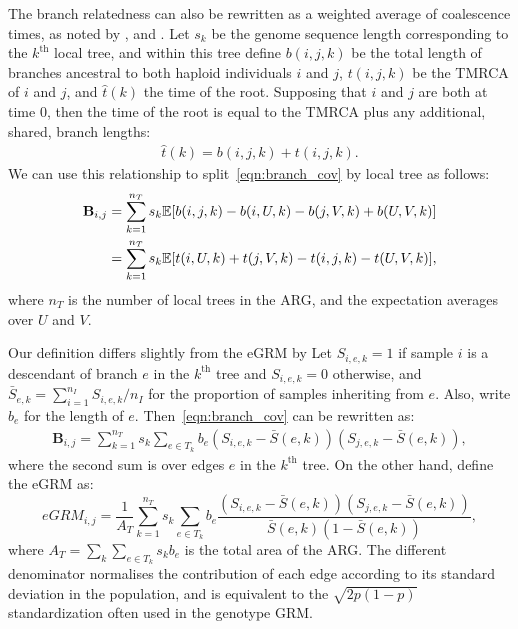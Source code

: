 The branch relatedness can also be rewritten as a weighted average of coalescence times,
as noted by \citet{mcvean2009genealogical, fan2022genealogical}, and \citet{zhang2023biobank}.
%
Let $s_k$ be the genome sequence length corresponding to the $k^\text{th}$ local tree,
and within this tree define
$b(i,j,k)$ be the total length of branches ancestral to both haploid individuals $i$ and $j$, $t(i,j,k)$
be the TMRCA of $i$ and $j$, and $\hat{t}(k)$ the time of the root.
%
Supposing that $i$ and $j$ are both at time 0,
then the time of the root is equal to the TMRCA plus any additional, shared, branch lengths:
%
\begin{align} \label{eqn:branch_relations}
    \hat{t}(k) = b(i,j,k) + t(i,j,k) .
\end{align}
%
We can use this relationship to split~\eqref{eqn:branch_cov} by local tree as follows:
%
\begin{align}
    \mathbf{B}_{i,j}
        & = \sum_{k = 1}^{n_T} s_k \mathbb{E}[b(i,j,k) - b(i,U,k) - b(j,V,k) + b(U,V,k)] \\
        & = \sum_{k = 1}^{n_T} s_k \mathbb{E}[t(i,U,k) + t(j,V,k) - t(i,j,k) - t(U,V,k)],
\end{align}
%
where $n_T$ is the number of local trees in the ARG, %
and the expectation averages over $U$ and $V$.

Our definition differs slightly from the eGRM by \citet{fan2022genealogical}
%
Let $S_{i,e,k} = 1$ if sample $i$ is a descendant of branch $e$
in the $k^\text{th}$ tree and $S_{i,e,k} = 0$ otherwise,
and $\bar{S}_{e,k} = \sum_{i=1}^{n_I} S_{i,e,k} / n_I$
for the proportion of samples inheriting from $e$.
Also, write $b_e$ for the length of $e$.
%
Then~\eqref{eqn:branch_cov} can be rewritten as:
\begin{align*}
    \mathbf{B}_{i,j}
    = \sum_{k=1}^{n_T} s_k \sum_{e \in T_k} b_e (S_{i,e,k} - \bar{S}(e,k))(S_{j,e,k} - \bar{S}(e,k)) ,
\end{align*}
where the second sum is over edges $e$ in the $k^\text{th}$ tree.
%
On the other hand, \citet{fan2022genealogical} define the eGRM as:
%
\begin{equation}
    eGRM_{i,j}
    = \frac{1}{A_T} \sum_{k=1}^{n_T} s_k \sum_{e \in T_k} b_e \frac{
        (S_{i,e,k} - \bar{S}(e,k))(S_{j,e,k} - \bar{S}(e,k)) 
        }{
        \bar{S}(e,k) (1 - \bar{S}(e,k))
        } ,
\end{equation}
where $A_T = \sum_k \sum_{e \in T_k} s_k b_e$ is the total area of the ARG.
%
The different denominator normalises the contribution of each edge according to its standard deviation in the population,
and is equivalent to the $\sqrt{2p(1-p)}$ standardization often used in the genotype GRM.

